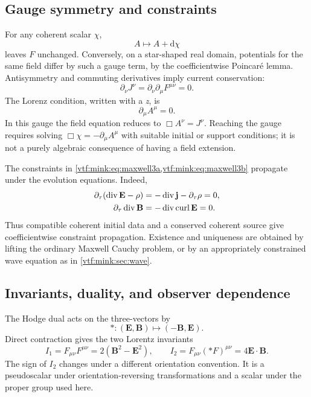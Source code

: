 \documentclass[11pt,letterpaper]{article}
\theoremstyle{definition}
\theoremstyle{remark}
\newcommand{\curl}{\operatorname{curl}}
\newcommand{\dd}{\mathrm d}
\begin{document}
\subsection{Gauge symmetry and constraints}
For any coherent scalar $\chi$,
\begin{equation}
 A\longmapsto A+\dd\chi
\end{equation}
leaves $F$ unchanged. Conversely, on a star-shaped real domain, potentials for the same field differ by such a gauge term, by the coefficientwise Poincar\'e lemma. Antisymmetry and commuting derivatives imply current conservation:
\begin{equation}
 \partial_\nu J^\nu
 =\partial_\nu\partial_\mu F^{\mu\nu}=0.
\end{equation}
The Lorenz condition, written with a \emph{z}, is
\begin{equation}
 \partial_\mu A^\mu=0.
\end{equation}
In this gauge the field equation reduces to $\Box A^\nu=J^\nu$. Reaching the gauge requires solving $\Box\chi=-\partial_\mu A^\mu$ with suitable initial or support conditions; it is not a purely algebraic consequence of having a field extension.

The constraints in \cref{vtf:mink:eq:maxwell3a,vtf:mink:eq:maxwell3b} propagate under the evolution equations. Indeed,
\begin{align}
 \partial_\tau(\Div\mathbf E-\rho)
 &=-\Div\mathbf j-\partial_\tau\rho=0,\\
 \partial_\tau\Div\mathbf B&=-\Div\curl\mathbf E=0.
\end{align}
Thus compatible coherent initial data and a conserved coherent source give coefficientwise constraint propagation. Existence and uniqueness are obtained by lifting the ordinary Maxwell Cauchy problem, or by an appropriately constrained wave equation as in \cref{vtf:mink:sec:wave}.

\subsection{Invariants, duality, and observer dependence}
The Hodge dual acts on the three-vectors by
\begin{equation}
 *:(\mathbf E,\mathbf B)\longmapsto(-\mathbf B,\mathbf E).
\end{equation}
Direct contraction gives the two Lorentz invariants
\begin{equation}\label{vtf:mink:eq:EMinvariants}
 I_1=F_{\mu\nu}F^{\mu\nu}=2(\mathbf B^2-\mathbf E^2),
 \qquad
 I_2=F_{\mu\nu}(* F)^{\mu\nu}=4\mathbf E\cdot\mathbf B.
\end{equation}
The sign of $I_2$ changes under a different orientation convention. It is a pseudoscalar under orientation-reversing transformations and a scalar under the proper group used here.
\end{document}
